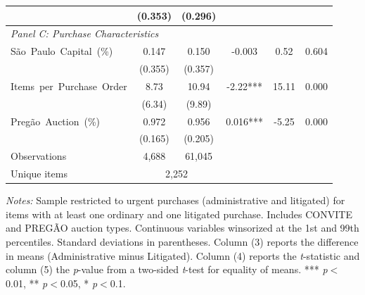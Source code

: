 \begin{table}[ht]
\begin{threeparttable}
\begin{tabular}{lccccc}
    & (0.353) & (0.296) & & & \\[3pt]
    \hline
    \multicolumn{6}{l}{\textit{Panel C: Purchase Characteristics}} \\[3pt]
    S\~ao~Paulo~Capital~(\%) & 0.147 & 0.150 & -0.003 & 0.52 & 0.604 \\
    & (0.355) & (0.357) & & & \\[3pt]
    Items~per~Purchase~Order & 8.73 & 10.94 & -2.22*** & 15.11 & 0.000 \\
    & (6.34) & (9.89) & & & \\[3pt]
    Preg\~ao~Auction~(\%) & 0.972 & 0.956 & 0.016*** & -5.25 & 0.000 \\
    & (0.165) & (0.205) & & & \\[3pt]
    \hline
    Observations & 4,688 & 61,045 & & & \\
    Unique items & \multicolumn{2}{c}{2,252} & & & \\
    \hline\hline
  \end{tabular}
  \begin{tablenotes}
    \small
    \item \textit{Notes:} Sample restricted to urgent purchases (administrative and litigated) for items with at least one ordinary and one litigated purchase. Includes CONVITE and PREG\~AO auction types. Continuous variables winsorized at the 1st and 99th percentiles. Standard deviations in parentheses. Column (3) reports the difference in means (Administrative minus Litigated). Column (4) reports the \textit{t}-statistic and column (5) the \textit{p}-value from a two-sided \textit{t}-test for equality of means.
    *** \textit{p}$<$0.01, ** \textit{p}$<$0.05, * \textit{p}$<$0.1.
  \end{tablenotes}
  \end{threeparttable}
\end{table}
